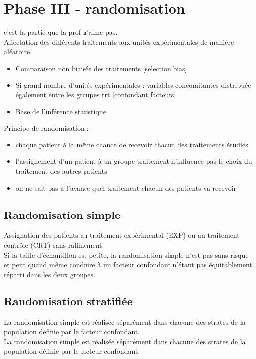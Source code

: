 \chapter{Phase III - randomisation}
c'est la partie que la prof n'aime pas.\\

Affectation des différents traitements aux unités expérimentales de manière aléatoire.\\

\begin{itemize}
    \item Comparaison non biaisée des traitements [selection bias]
    \item Si grand nombre d’unités expérimentales : variables concomitantes
distribuée également entre les groupes trt [confondant facteurs]
    \item Base de l’inférence statistique
\end{itemize}

Principe de randomisation :
\begin{itemize}
    \item chaque patient à la même chance de recevoir chacun des traitements étudiés
    \item l’assignement d’un patient à un groupe traitement n’influence pas le choix du traitement des autres patients
    \item on ne sait pas à l’avance quel traitement chacun des patients va recevoir
\end{itemize}
\section{Randomisation simple}
Assignation des patients au traitement expérimental (EXP) ou
au traitement contrôle (CRT) sans raffinement.\\

Si la taille d’échantillon est petite, la randomisation simple n’est pas sans risque et peut quand même conduire à un facteur confondant n’étant pas équitablement réparti dans les deux groupes.


\section{Randomisation stratifiée}
La randomisation simple est réalisée séparément dans chacune des strates de la population définie par le facteur confondant.\\

La randomisation simple est réalisée séparément dans chacune des strates de la population définie par le facteur confondant.\\

